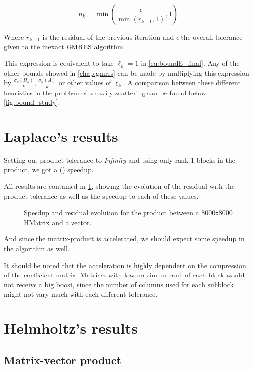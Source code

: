 \begin{equation}
    n_{k} = \min \left(\frac{\epsilon}{\min(\tilde{r}_{k-1},1)},1 \right)
\end{equation}

Where $\tilde{r}_{k-1}$ is the residual of the previous iteration and $\epsilon$ the overall tolerance given to the inexact GMRES algorithm.

This expression is equivalent to take $\ell_{k} = 1$ in \autoref{eq:boundE_final}. Any of the other bounds showed in \autoref{chap:gmres} can be made by multiplying this expression by $\frac{\sigma_{k}(H_{k})}{k}$, $\frac{\sigma_{n}(A)}{k}$ or other values of $\ell_{k}$. A comparison between these different heuristics in the problem of a cavity scattering can be found below \ref{fig:bound_study}.

\section{Laplace's results}

Setting our product tolerance to \textit{Infinity} and using only rank-1 blocks in the product, we got a () speedup.

All results are contained in \ref{fig:laplace_results}, showing the evolution of the residual with the product tolerance as well as the speedup to each of these values.

\begin{figure}[h!]
    \centering
    
    \caption{Speedup and residual evolution for the product between a 8000x8000 HMatrix and a vector.}
    \label{fig:laplace_results}
\end{figure}

And since the matrix-product is accelerated, we should expect some speedup in the algorithm as well.

It should be noted that the acceleration is highly dependent on the compression of the coefficient matrix. Matrices with low maximum rank of each block would not receive a big boost, since the number of columns used for each subblock might not vary much with each different tolerance.

\section{Helmholtz's results}

\subsection{Matrix-vector product}


